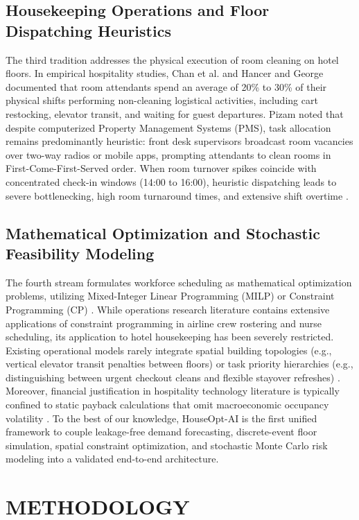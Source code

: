 \documentclass[11pt,a4paper]{article}
\begin{document}
\subsection{Housekeeping Operations and Floor Dispatching Heuristics}
The third tradition addresses the physical execution of room cleaning on hotel floors. In empirical hospitality studies, Chan et al. \cite{chan2013} and Hancer and George \cite{hancer2003} documented that room attendants spend an average of 20\% to 30\% of their physical shifts performing non-cleaning logistical activities, including cart restocking, elevator transit, and waiting for guest departures. Pizam \cite{pizam2017} noted that despite computerized Property Management Systems (PMS), task allocation remains predominantly heuristic: front desk supervisors broadcast room vacancies over two-way radios or mobile apps, prompting attendants to clean rooms in First-Come-First-Served order. When room turnover spikes coincide with concentrated check-in windows (14:00 to 16:00), heuristic dispatching leads to severe bottlenecking, high room turnaround times, and extensive shift overtime \cite{chan2013}.

\subsection{Mathematical Optimization and Stochastic Feasibility Modeling}
The fourth stream formulates workforce scheduling as mathematical optimization problems, utilizing Mixed-Integer Linear Programming (MILP) or Constraint Programming (CP) \cite{lee2018}. While operations research literature contains extensive applications of constraint programming in airline crew rostering and nurse scheduling, its application to hotel housekeeping has been severely restricted. Existing operational models rarely integrate spatial building topologies (e.g., vertical elevator transit penalties between floors) or task priority hierarchies (e.g., distinguishing between urgent checkout cleans and flexible stayover refreshes) \cite{sainaghi2021}. Moreover, financial justification in hospitality technology literature is typically confined to static payback calculations that omit macroeconomic occupancy volatility \cite{lee2018}. To the best of our knowledge, HouseOpt-AI is the first unified framework to couple leakage-free demand forecasting, discrete-event floor simulation, spatial constraint optimization, and stochastic Monte Carlo risk modeling into a validated end-to-end architecture.

\section{METHODOLOGY}
\end{document}
